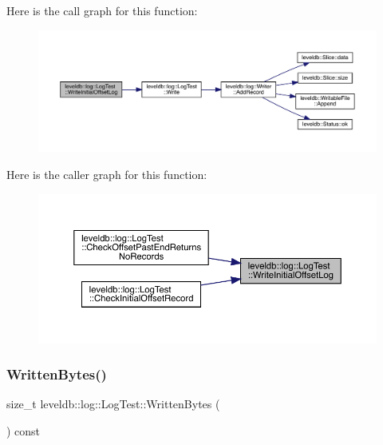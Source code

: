 Here is the call graph for this function\+:
\nopagebreak
\begin{figure}[H]
\begin{center}
\leavevmode
\includegraphics[width=350pt]{classleveldb_1_1log_1_1_log_test_af0053e30c5ccaa5e2e10d595a4f48565_cgraph}
\end{center}
\end{figure}
Here is the caller graph for this function\+:
\nopagebreak
\begin{figure}[H]
\begin{center}
\leavevmode
\includegraphics[width=350pt]{classleveldb_1_1log_1_1_log_test_af0053e30c5ccaa5e2e10d595a4f48565_icgraph}
\end{center}
\end{figure}
\mbox{\label{classleveldb_1_1log_1_1_log_test_a602824b02f9220d6813768f6f700db47}} 
\subsubsection{\texorpdfstring{WrittenBytes()}{WrittenBytes()}}
{\footnotesize\ttfamily size\+\_\+t leveldb\+::log\+::\+Log\+Test\+::\+Written\+Bytes (\begin{DoxyParamCaption}{ }\end{DoxyParamCaption}) const\hspace{0.3cm}{\ttfamily [inline]}}

